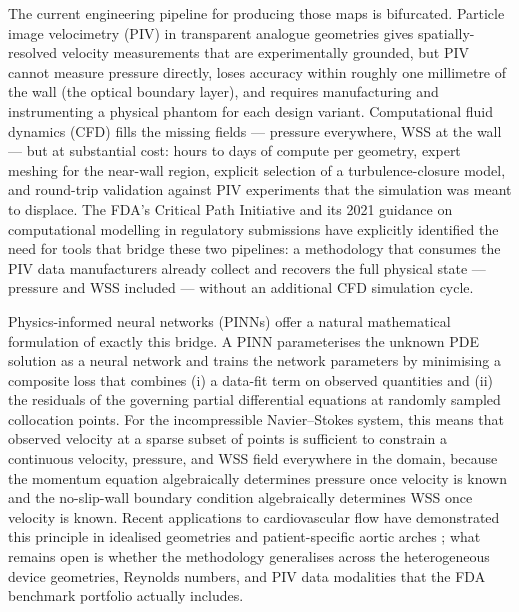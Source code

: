 \documentclass[12pt,a4paper]{article}
\begin{document}
The current engineering pipeline for producing those maps is
bifurcated. Particle image velocimetry (PIV) in transparent
analogue geometries gives spatially-resolved velocity
measurements that are experimentally grounded, but PIV cannot
measure pressure directly, loses accuracy within roughly one
millimetre of the wall (the optical boundary layer), and
requires manufacturing and instrumenting a physical phantom for
each design variant. Computational fluid dynamics (CFD) fills
the missing fields --- pressure everywhere, WSS at the wall ---
but at substantial cost: hours to days of compute per geometry,
expert meshing for the near-wall region, explicit selection of
a turbulence-closure model, and round-trip validation against
PIV experiments that the simulation was meant to displace. The
FDA's Critical Path Initiative \cite{FDACriticalPath2004} and
its 2021 guidance on computational modelling in regulatory
submissions \cite{FDA2021InSilico} have explicitly identified
the need for tools that bridge these two pipelines: a
methodology that consumes the PIV data manufacturers already
collect and recovers the full physical state --- pressure and
WSS included --- without an additional CFD simulation cycle.

Physics-informed neural networks (PINNs)
\cite{Raissi2019PINN1, Raissi2019PINN2} offer a natural
mathematical formulation of exactly this bridge. A PINN
parameterises the unknown PDE solution as a neural network and
trains the network parameters by minimising a composite loss
that combines (i) a data-fit term on observed quantities and
(ii) the residuals of the governing partial differential
equations at randomly sampled collocation points. For the
incompressible Navier--Stokes system, this means that observed
velocity at a sparse subset of points is sufficient to constrain
a continuous velocity, pressure, and WSS field everywhere in
the domain, because the momentum equation algebraically
determines pressure once velocity is known and the
no-slip-wall boundary condition algebraically determines WSS
once velocity is known. Recent applications to cardiovascular
flow have demonstrated this principle in idealised geometries
and patient-specific aortic arches
\cite{Raissi2020HFM, Arzani2021PINN_Blood, Kissas2020CardiacPINN};
what remains open is whether the methodology generalises across
the heterogeneous device geometries, Reynolds numbers, and PIV
data modalities that the FDA benchmark portfolio actually
includes.
\end{document}
